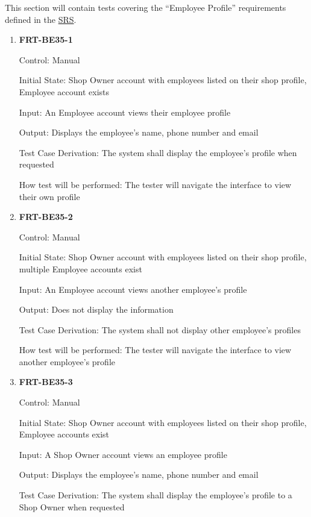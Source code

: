 \documentclass[12pt, titlepage]{article}
\begin{document}
This section will contain tests covering the ``Employee Profile'' requirements defined in the
\href{https://github.com/arkinmodi/project-sayyara/blob/main/docs/SRS/SRS.pdf}{SRS}.

\begin{enumerate}
	\item \textbf{FRT-BE35-1}

	      Control: Manual

	      Initial State: Shop Owner account with employees listed on their shop profile, Employee account
	      exists

	      Input: An Employee account views their employee profile

	      Output: Displays the employee's name, phone number and email

	      Test Case Derivation: The system shall display the employee's profile when requested

	      How test will be performed: The tester will navigate the interface to view their own profile

	\item \textbf{FRT-BE35-2}

	      Control: Manual

	      Initial State: Shop Owner account with employees listed on their shop profile, multiple Employee
	      accounts exist

	      Input: An Employee account views another employee's profile

	      Output: Does not display the information

	      Test Case Derivation: The system shall not display other employee's profiles

	      How test will be performed: The tester will navigate the interface to view another employee's
	      profile

	\item \textbf{FRT-BE35-3}

	      Control: Manual

	      Initial State: Shop Owner account with employees listed on their shop profile, Employee accounts
	      exist

	      Input: A Shop Owner account views an employee profile

	      Output: Displays the employee's name, phone number and email

	      Test Case Derivation: The system shall display the employee's profile to a Shop Owner when
	      requested


\end{enumerate}
\end{document}
